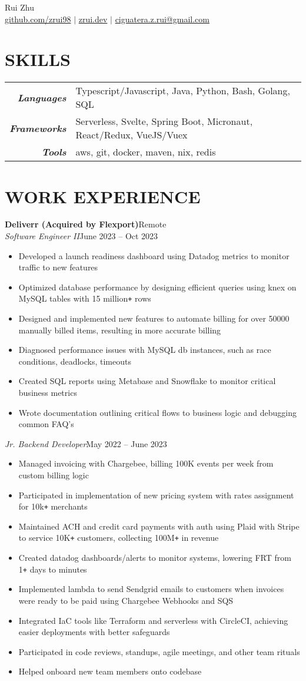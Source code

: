 \documentclass[letterpaper]{article}
\newcommand{\Header}[2]{\begin{center}
	\huge\usefont{OT1}{lmss}{m}{n}
		#1 \\
	\small{#2}
\end{center}}
\newcommand{\SplitEntry}[2]{\textbf{\textit{#1}} & \small{#2}\\}
\newcommand{\NewPart}[1]{\section*{\large\uppercase{\textbf{#1}}}}
\newcommand{\JobEntry}[3]{
	\normalsize\textbf{#1}\hfill\normalsize{#2}\\
	#3\vspace{0.1cm}
}
\newcommand{\DatedEntry}[3]{
	\small\textit{#1}\hfill\small{#2}\\
	\vspace{0.1cm}#3\vspace{0.1cm}
}
\begin{document}
\Header{Rui Zhu}{\href{https://github.com/zrui98}{github.com/zrui98} $|$ \href{https://zrui.dev}{zrui.dev} $|$ \href{mailto:ciguatera.z.rui@gmail.ca}{ciguatera.z.rui@gmail.com}}\vspace{-0.5cm}

\NewPart{Skills}
\begin{tabular}{r|l}
	\SplitEntry{Languages}{Typescript/Javascript, Java, Python, Bash, Golang, SQL}
	\SplitEntry{Frameworks}{Serverless, Svelte, Spring Boot, Micronaut, React/Redux, VueJS/Vuex}
	\SplitEntry{Tools}{aws, git, docker, maven, nix, redis}
\end{tabular}\vspace{-0.2cm}

\NewPart{Work Experience}
\JobEntry{Deliverr (Acquired by Flexport)}
{Remote}
{
	\DatedEntry{Software Engineer II}
	{June 2023 -- Oct 2023}
	{
		\begin{itemize}[nolistsep]
			\item Developed a launch readiness dashboard using Datadog metrics to monitor traffic to new features
			\item Optimized database performance by designing efficient queries using knex on MySQL tables with 15 million\texttt{+} rows
			\item Designed and implemented new features to automate billing for over 50000 manually billed items, resulting in more accurate billing
			\item Diagnosed performance issues with MySQL db instances, such as race conditions, deadlocks, timeouts
			\item Created SQL reports using Metabase and Snowflake to monitor critical business metrics
			\item Wrote documentation outlining critical flows to business logic and debugging common FAQ's
		\end{itemize}
	}
	\DatedEntry{Jr. Backend Developer}
	{May 2022 -- June 2023}
	{
		\begin{itemize}[nolistsep]
			\item Managed invoicing with Chargebee, billing 100K events per week from custom billing logic
			\item Participated in implementation of new pricing system with rates assignment for 10k\texttt{+} merchants
			\item Maintained ACH and credit card payments with auth using Plaid with Stripe to service 10K\texttt{+} customers, collecting 100M\texttt{+} in revenue
			\item Created datadog dashboards/alerts to monitor systems, lowering FRT from 1\texttt{+} days to minutes
			\item Implemented lambda to send Sendgrid emails to customers when invoices were ready to be paid using Chargebee Webhooks and SQS
			\item Integrated IaC tools like Terraform and serverless with CircleCI, achieving easier deployments with better safeguards
			\item Participated in code reviews, standups, agile meetings, and other team rituals
			\item Helped onboard new team members onto codebase
		\end{itemize}
	}
}
\end{document}
